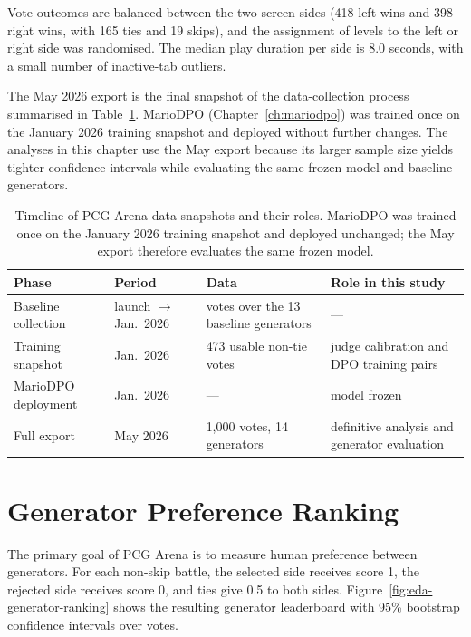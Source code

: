 \documentclass[shortabstract, mgr, english]{iithesis}
\begin{document}
Vote outcomes are balanced between the two screen sides (418 left wins and 398 right wins, with 165 ties and 19 skips), and the assignment of levels to the left or right side was randomised. The median play duration per side is 8.0 seconds, with a small number of inactive-tab outliers.

The May 2026 export is the final snapshot of the data-collection process summarised in Table~\ref{tab:eda-timeline}.
MarioDPO (Chapter~\ref{ch:mariodpo}) was trained once on the January 2026 training snapshot and deployed without further changes. The analyses in this chapter use the May export because its larger sample size yields tighter confidence intervals while evaluating the same frozen model and baseline generators.

\begin{table}[H]
\centering
\footnotesize
\begin{tabular}{@{} l l p{2.4cm} p{4.2cm} @{}}
\toprule
\textbf{Phase} & \textbf{Period} & \textbf{Data} & \textbf{Role in this study} \\
\midrule
Baseline collection & launch $\to$ Jan.\ 2026 & votes over the 13 baseline generators & --- \\
Training snapshot & Jan.\ 2026 & 473 usable non-tie votes & judge calibration and DPO training pairs \\
MarioDPO deployment & Jan.\ 2026 & --- & model frozen \\
Full export & May 2026 & 1,000 votes, 14 generators & definitive analysis and generator evaluation \\
\bottomrule
\end{tabular}
\caption{Timeline of PCG Arena data snapshots and their roles.
MarioDPO was trained once on the January 2026 training snapshot and deployed
unchanged; the May export therefore evaluates the same frozen model.}
\label{tab:eda-timeline}
\end{table}

\section{Generator Preference Ranking}
\label{sec:eda-rankings}

The primary goal of PCG Arena is to measure human preference between generators. For each non-skip battle, the selected side receives score 1, the rejected side receives score 0, and ties give 0.5 to both sides. Figure~\ref{fig:eda-generator-ranking} shows the resulting generator leaderboard with 95\% bootstrap confidence intervals over votes.
\end{document}
